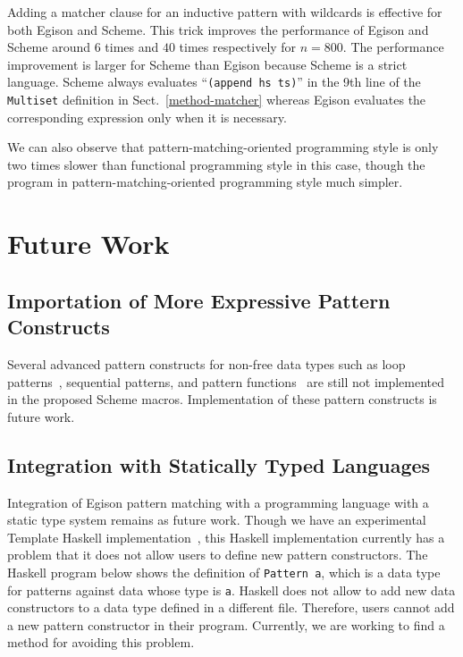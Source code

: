 \documentclass[acmlarge]{acmart}
\begin{document}
Adding a matcher clause for an inductive pattern with wildcards is effective for both Egison and Scheme.
This trick improves the performance of Egison and Scheme around $6$ times and $40$ times respectively for $n=800$.
The performance improvement is larger for Scheme than Egison because Scheme is a strict language.
Scheme always evaluates ``\texttt{(append hs ts)}'' in the 9th line of the \texttt{Multiset} definition in Sect.~\ref{method-matcher} whereas Egison evaluates the corresponding expression only when it is necessary.

We can also observe that pattern-matching-oriented programming style is only two times slower than functional programming style in this case, though the program in pattern-matching-oriented programming style much simpler.

\section{Future Work}\label{future}

\subsection{Importation of More Expressive Pattern Constructs}

Several advanced pattern constructs for non-free data types such as loop patterns~\cite{egi2018loop}, sequential patterns, and pattern functions~\cite{egisonPat} are still not implemented in the proposed Scheme macros.
Implementation of these pattern constructs is future work.

\subsection{Integration with Statically Typed Languages}

Integration of Egison pattern matching with a programming language with a static type system remains as future work.
Though we have an experimental Template Haskell implementation~\cite{egisonHaskell}, this Haskell implementation currently has a problem that it does not allow users to define new pattern constructors.
The Haskell program below shows the definition of \texttt{Pattern a}, which is a data type for patterns against data whose type is \texttt{a}.
Haskell does not allow to add new data constructors to a data type defined in a different file.
Therefore, users cannot add a new pattern constructor in their program.
Currently, we are working to find a method for avoiding this problem.
\end{document}
